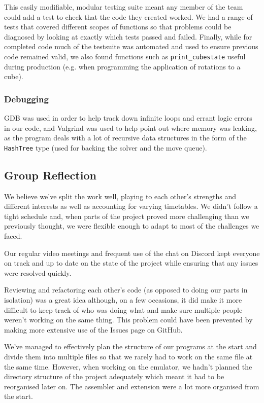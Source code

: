 \documentclass[8pt]{article}
\begin{document}
This easily modifiable, modular testing suite meant any member of the team could add a test to check that the code they created worked.
We had a range of tests that covered different scopes of functions so that problems could be diagnosed by looking at exactly which tests passed and failed.
Finally, while for completed code much of the testsuite was automated and used to ensure previous code remained valid, we also found functions such as 
\texttt{print\_cubestate} useful during production (e.g. when programming the application of rotations to a cube).

\subsubsection{Debugging}

GDB was used in order to help track down infinite loops and errant logic errors in our code, and Valgrind was used to help point out where memory was leaking, as the program deals with a lot of recursive data structures in the form of the \texttt{HashTree} type (used for backing the solver and the move queue).

\subsection{Group Reflection}

We believe we've split the work well, playing to each other's strengths and different interests
as well as accounting for varying timetables. We didn't follow a tight schedule and,
when parts of the project proved more challenging than we previously thought, we were
flexible enough to adapt to most of the challenges we faced.

Our regular video meetings and frequent use of the chat on Discord kept everyone on track
and up to date on the state of the project while ensuring that any issues were resolved quickly.

Reviewing and refactoring each other's code (as opposed to doing our parts in isolation) was
a great idea although, on a few occasions, it did make it more difficult to keep track of 
who was doing what and make sure multiple people weren't working on the same thing.
This problem could have been prevented by making more extensive use of the Issues page
on GitHub.

We've managed to effectively plan the structure of our programs at the start and divide them
into multiple files so that we rarely had to work on the same file at the same time.
However, when working on the emulator, we hadn't planned the directory structure of the project
adequately which meant it had to be reorganised later on. The assembler and extension were
a lot more organised from the start.
\end{document}
